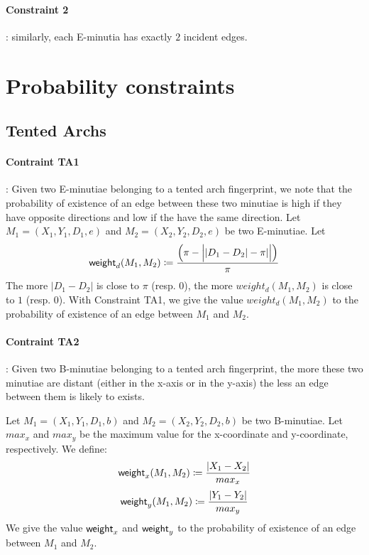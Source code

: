 \documentclass[8pt]{article}
\begin{document}
\paragraph{Constraint 2}:
similarly, each E-minutia has exactly $2$ incident edges.


\section{Probability constraints}
\subsection{Tented Archs}
\paragraph{Contraint TA1}:
Given two E-minutiae belonging to a tented arch fingerprint, we note that 
the probability of existence of an edge between these two minutiae 
is high if they have opposite directions and low if the have 
the same direction.
Let $M_1=(X_1,Y_1,D_1,e)$ and $M_2=(X_2,Y_2,D_2,e)$ be two E-minutiae.
Let 
  \begin{align*}
    \textsf{weight}_d(M_1,M_2) \coloneqq 
    \frac{
      \left( \pi - \Big\lvert \lvert D_1-D_2 \rvert - 
      \pi \rvert\Big\rvert \right)}{\pi}
  \end{align*} 
The more $\lvert D_1-D_2 \rvert$ is close to $\pi$ (resp. $0$), the more 
$weight_d(M_1,M_2)$ is close to $1$ (resp. $0$).
With Constraint TA1, we give the value $weight_d(M_1,M_2)$ to the probability 
of existence of an edge between $M_1$ and $M_2$.



\paragraph{Contraint TA2}:
Given two B-minutiae belonging to a tented arch fingerprint, the more
these two minutiae are distant (either in the x-axis or in the y-axis)
the less an edge between them is likely to exists.

Let $M_1=(X_1,Y_1,D_1,b)$ and $M_2=(X_2,Y_2,D_2,b)$ be two B-minutiae.
Let $max_x$ and $max_y$ be the maximum value for the x-coordinate and
y-coordinate, respectively. We define:
  \begin{align*}
    \textsf{weight}_x(M_1,M_2) \coloneqq
    \frac{\lvert X_1 - X_2 \rvert}{max_x}
  \end{align*}
  \begin{align*}
    \textsf{weight}_y(M_1,M_2) \coloneqq
    \frac{\lvert Y_1 - Y_2 \rvert}{max_y}
  \end{align*}
We give the value $\textsf{weight}_x$ and $\textsf{weight}_y$ to the probability 
of existence of an edge between $M_1$ and $M_2$.
\end{document}
